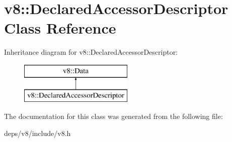 \hypertarget{classv8_1_1_declared_accessor_descriptor}{}\section{v8\+:\+:Declared\+Accessor\+Descriptor Class Reference}
\label{classv8_1_1_declared_accessor_descriptor}
Inheritance diagram for v8\+:\+:Declared\+Accessor\+Descriptor\+:\begin{figure}[H]
\begin{center}
\leavevmode
\includegraphics[height=2.000000cm]{classv8_1_1_declared_accessor_descriptor}
\end{center}
\end{figure}


The documentation for this class was generated from the following file\+:\begin{DoxyCompactItemize}
\item 
deps/v8/include/v8.\+h\end{DoxyCompactItemize}
